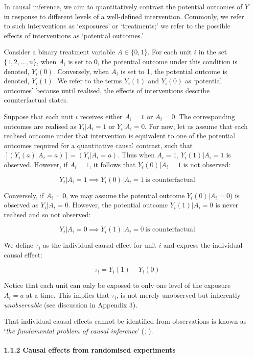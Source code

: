 \documentclass[
  singlecolumn]{article}
\let\oldparagraph\paragraph
\renewcommand{\paragraph}[1]{\oldparagraph{#1}\mbox{}}
\begin{document}
In causal inference, we aim to quantitatively contrast the potential
outcomes of \(Y\) in response to different levels of a well-defined
intervention. Commonly, we refer to such interventions as `exposures' or
`treatments;' we refer to the possible effects of interventions as
`potential outcomes.'

Consider a binary treatment variable \(A \in \{0,1\}\). For each unit
\(i\) in the set \(\{1, 2, \ldots, n\}\), when \(A_i\) is set to 0, the
potential outcome under this condition is denoted, \(Y_i(0)\).
Conversely, when \(A_i\) is set to 1, the potential outcome is denoted,
\(Y_i(1)\). We refer to the terms \(Y_i(1)\) and \(Y_i(0)\) as
`potential outcomes' because until realised, the effects of
interventions describe counterfactual states.

Suppose that each unit \(i\) receives either \(A_i = 1\) or \(A_i = 0\).
The corresponding outcomes are realised as \(Y_i|A_i = 1\) or
\(Y_i|A_i = 0\). For now, let us assume that each realised outcome under
that intervention is equivalent to one of the potential outcomes
required for a quantitative causal contrast, such that
\([(Y_i(a)|A_i = a)] = (Y_i|A_i = a)\). Thus when \(A_i = 1\),
\(Y_i(1)|A_i = 1\) is observed. However, if \(A_i = 1\), it follows that
\(Y_i(0)|A_i = 1\) is not observed:

\[
Y_i|A_i = 1 \implies Y_i(0)|A_i = 1~ \text{is counterfactual}
\]

Conversely, if \(A_i = 0\), we may assume the potential outcome
\(Y_i(0)|A_i = 0\)) is observed as \(Y_i|A_i = 0\). However, the
potential outcome \(Y_i(1)|A_i = 0\) is never realised and so not
observed:

\[
Y_i|A_i = 0 \implies Y_i(1)|A_i = 0~ \text{is counterfactual}
\]

We define \(\tau_i\) as the individual causal effect for unit \(i\) and
express the individual causal effect:

\[
\tau_i = Y_i(1) - Y_i(0)
\]

Notice that each unit can only be exposed to only one level of the
exposure \(A_i = a\) at a time. This implies that \(\tau_i\), is not
merely unobserved but inherently \emph{unobservable} (see discussion in
Appendix 3).

That individual causal effects cannot be identified from observations is
known as `\emph{the fundamental problem of causal inference}'
(;
).

\paragraph{1.1.2 Causal effects from randomised
experiments}\label{causal-effects-from-randomised-experiments}
\end{document}
